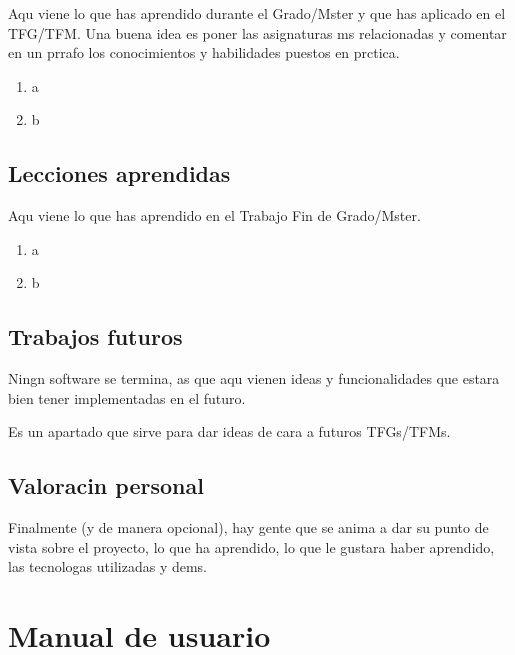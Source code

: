 \documentclass[a4paper, 12pt]{book}
\begin{document}
Aqu viene lo que has aprendido durante el Grado/Mster y que has aplicado
en el TFG/TFM. Una buena idea es poner las asignaturas ms relacionadas y
comentar en un prrafo los conocimientos y habilidades puestos en prctica.

\begin{enumerate}
  \item a
  \item b
\end{enumerate}


\section{Lecciones aprendidas}
\label{sec:lecciones_aprendidas}

Aqu viene lo que has aprendido en el Trabajo Fin de Grado/Mster.

\begin{enumerate}
  \item a
  \item b
\end{enumerate}


\section{Trabajos futuros}
\label{sec:trabajos_futuros}

Ningn software se termina, as que aqu vienen ideas y funcionalidades
que estara bien tener implementadas en el futuro.

Es un apartado que sirve para dar ideas de cara a futuros TFGs/TFMs.


\section{Valoracin personal}
\label{sec:valoracion}

Finalmente (y de manera opcional), hay gente que se anima a dar su punto de
vista sobre el proyecto, lo que ha aprendido, lo que le gustara haber aprendido,
las tecnologas utilizadas y dems.




\cleardoublepage
\appendix
\chapter{Manual de usuario}
\label{app:manual}
\end{document}
